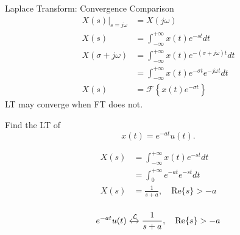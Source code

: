 \begin{frame}{Laplace Transform: Convergence Comparison}
    \begin{align*}
        \left.X(s)\right|_{s=j\omega} &= X(j\omega)\\
        X(s) &= \int_{-\infty}^{+\infty}x(t)e^{-st}dt\\
        X(\sigma + j\omega) &= \int_{-\infty}^{+\infty}x(t)e^{-(\sigma + j\omega)t}dt\\
        &= \int_{-\infty}^{+\infty}x(t)e^{-\sigma t}e^{-j\omega t}dt\\
        X(s) &= \mathcal{F}\left\{ x(t)e^{-\sigma t}\right\}
    \end{align*}
    {
        LT may converge when FT does not.
    }
\end{frame}

\begin{frame}[t,allowframebreaks]{}
    \begin{example}
        Find the LT of
        \begin{equation*}
            x(t) = e^{-at}u(t).
        \end{equation*}
    \end{example}

    {
            \begin{align*}
                X(s) &= \int_{-\infty}^{+\infty}x(t)e^{-st}dt\\
                &= \int_{0}^{+\infty}e^{-at}e^{-st}dt\\
                X(s) &= \frac{1}{s+a}, \quad \mathrm{Re}\{s\} > -a\\
            \end{align*}

            \begin{equation*}
                e^{-at}u(t) \xleftrightarrow{\mathcal{L}}   \frac{1}{s+a}, \quad \mathrm{Re}\{s\} > -a
            \end{equation*}

    }

\end{frame}


